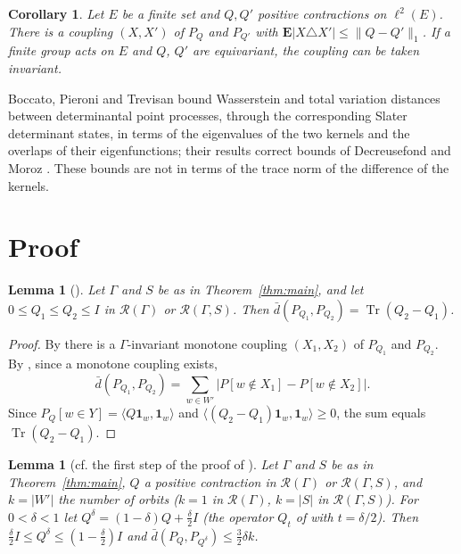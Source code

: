\documentclass[11pt]{amsart}
\newtheorem{lemma}[theorem]{Lemma}
\newtheorem{corollary}[theorem]{Corollary}
\theoremstyle{remark}
\numberwithin{equation}{section}
\newcommand{\Tr}{\operatorname{Tr}}
\newcommand{\dbar}{\bar d}
\newcommand{\R}{\mathcal{R}}
\begin{document}
\begin{corollary}\label{cor:finite}
Let $E$ be a finite set and $Q,Q'$ positive contractions on $\ell^2(E)$. There is a coupling $(X,X')$ of $P_Q$ and $P_{Q'}$ with $\mathbf E|X\triangle X'|\le\|Q-Q'\|_1$. If a finite group acts on $E$ and $Q$, $Q'$ are equivariant, the coupling can be taken invariant.
\end{corollary}

Boccato, Pieroni and Trevisan \cite{BPT26} bound Wasserstein and total variation distances between determinantal point processes, through the corresponding Slater determinant states, in terms of the eigenvalues of the two kernels and the overlaps of their eigenfunctions; their results correct bounds of Decreusefond and Moroz \cite{DM21}. These bounds are not in terms of the trace norm of the difference of the kernels.

\section{Proof}\label{sec:proof}

\begin{lemma}[{\cite[Theorem~5.1, Lemma~7.2]{LT16}}]\label{lem:mono}
Let $\Gamma$ and $S$ be as in Theorem~\ref{thm:main}, and let $0\le Q_1\le Q_2\le I$ in $\R(\Gamma)$ or $\R(\Gamma,S)$. Then $\dbar(P_{Q_1},P_{Q_2})=\Tr(Q_2-Q_1)$.
\end{lemma}

\begin{proof}
By \cite[Theorem~5.1]{LT16} there is a $\Gamma$-invariant monotone coupling $(X_1,X_2)$ of $P_{Q_1}$ and $P_{Q_2}$. By \cite[Lemma~7.2]{LT16}, since a monotone coupling exists,
\[
\dbar(P_{Q_1},P_{Q_2})=\sum_{w\in W'}\bigl|P[w\notin X_1]-P[w\notin X_2]\bigr| .
\]
Since $P_Q[w\in Y]=\langle Q\mathbf 1_w,\mathbf 1_w\rangle$ and $\langle(Q_2-Q_1)\mathbf 1_w,\mathbf 1_w\rangle\ge0$, the sum equals $\Tr(Q_2-Q_1)$.
\end{proof}

\begin{lemma}[cf. the first step of the proof of {\cite[Lemma~7.8]{LT16}}]\label{lem:shrink}
Let $\Gamma$ and $S$ be as in Theorem~\ref{thm:main}, $Q$ a positive contraction in $\R(\Gamma)$ or $\R(\Gamma,S)$, and $k=|W'|$ the number of orbits ($k=1$ in $\R(\Gamma)$, $k=|S|$ in $\R(\Gamma,S)$). For $0<\delta<1$ let $Q^\delta=(1-\delta)Q+\frac\delta2 I$ (the operator $Q_t$ of \cite{LT16} with $t=\delta/2$). Then $\frac\delta2 I\le Q^\delta\le(1-\frac\delta2)I$ and $\dbar(P_Q,P_{Q^\delta})\le\frac32\delta k$.
\end{lemma}
\end{document}

